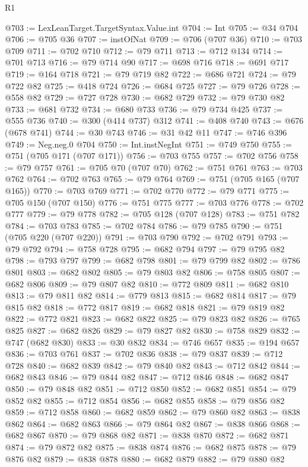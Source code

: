 \begin{lexlean}{R1}
\begin{coremodule}
{{{{{{{{{{{{{{{{{{{{{{{{{{{{{{{{{{{{{{{{{{{{{{{{{{@703 := LexLeanTarget.TargetSyntax.Value.int
@704 := Int
@705 := @34 @704
@706 := @705 @36
@707 := instOfNat
@709 := @706 (@707 @36)
@710 := @703 @709
@711 := @702 @710
@712 := @79 @711
@713 := @712 @134
@714 := @701 @713
@716 := @79 @714 @90
@717 := @698 @716
@718 := @691 @717
@719 := @164 @718
@721 := @79 @719 @82
@722 := @686 @721
@724 := @79 @722 @82
@725 := @418 @724
@726 := @684 @725
@727 := @79 @726
@728 := @558 @82
@729 := @727 @728
@730 := @682 @729
@732 := @79 @730 @82
@733 := @681 @732
@734 := @680 @733
@736 := @79 @734 @425
@737 := @555 @736
@740 := @300 (@414 @737) @312
@741 := @408 @740
@743 := @676 (@678 @741)
@744 := @30 @743
@746 := @31 @42 @11
@747 := @746 @396
@749 := Neg.neg.{0} @704
@750 := Int.instNegInt
@751 := @749 @750
@755 := @751 (@705 @171 (@707 @171))
@756 := @703 @755
@757 := @702 @756
@758 := @79 @757
@761 := @705 @70 (@707 @70)
@762 := @751 @761
@763 := @703 @762
@764 := @702 @763
@765 := @79 @764
@769 := @751 (@705 @165 (@707 @165))
@770 := @703 @769
@771 := @702 @770
@772 := @79 @771
@775 := @705 @150 (@707 @150)
@776 := @751 @775
@777 := @703 @776
@778 := @702 @777
@779 := @79 @778
@782 := @705 @128 (@707 @128)
@783 := @751 @782
@784 := @703 @783
@785 := @702 @784
@786 := @79 @785
@790 := @751 (@705 @220 (@707 @220))
@791 := @703 @790
@792 := @702 @791
@793 := @79 @792
@794 := @758 @728
@795 := @682 @794
@797 := @79 @795 @82
@798 := @793 @797
@799 := @682 @798
@801 := @79 @799 @82
@802 := @786 @801
@803 := @682 @802
@805 := @79 @803 @82
@806 := @758 @805
@807 := @682 @806
@809 := @79 @807 @82
@810 := @772 @809
@811 := @682 @810
@813 := @79 @811 @82
@814 := @779 @813
@815 := @682 @814
@817 := @79 @815 @82
@818 := @772 @817
@819 := @682 @818
@821 := @79 @819 @82
@822 := @772 @821
@823 := @682 @822
@825 := @79 @823 @82
@826 := @765 @825
@827 := @682 @826
@829 := @79 @827 @82
@830 := @758 @829
@832 := @747 (@682 @830)
@833 := @30 @832
@834 := @746 @657
@835 := @194 @657
@836 := @703 @761
@837 := @702 @836
@838 := @79 @837
@839 := @712 @728
@840 := @682 @839
@842 := @79 @840 @82
@843 := @712 @842
@844 := @682 @843
@846 := @79 @844 @82
@847 := @712 @846
@848 := @682 @847
@850 := @79 @848 @82
@851 := @712 @850
@852 := @682 @851
@854 := @79 @852 @82
@855 := @712 @854
@856 := @682 @855
@858 := @79 @856 @82
@859 := @712 @858
@860 := @682 @859
@862 := @79 @860 @82
@863 := @838 @862
@864 := @682 @863
@866 := @79 @864 @82
@867 := @838 @866
@868 := @682 @867
@870 := @79 @868 @82
@871 := @838 @870
@872 := @682 @871
@874 := @79 @872 @82
@875 := @838 @874
@876 := @682 @875
@878 := @79 @876 @82
@879 := @838 @878
@880 := @682 @879
@882 := @79 @880 @82
}}}}}}}}}}}}}}}}}}}}}}}}}}}}}}}}}}}}}}}}}}}}}}}}}}
\end{coremodule}
\end{lexlean}
